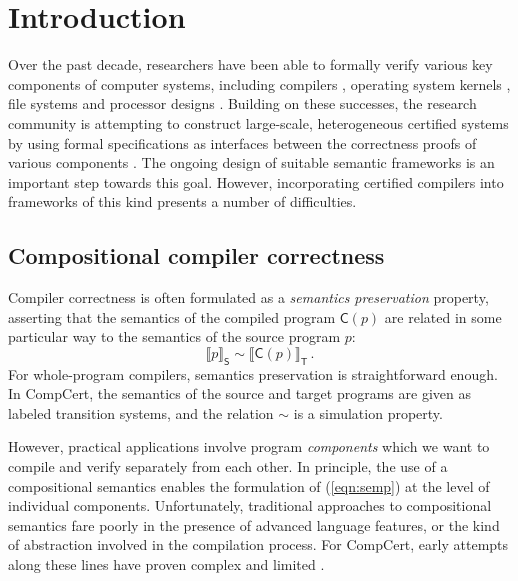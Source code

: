 \documentclass[sigplan,screen,review]{acmart}
\newcommand{\kw}[1]{\ensuremath{ \mathsf{#1} }}
\begin{document}


\maketitle

\section{Introduction} %


Over the past decade,
researchers have been able to formally verify
various key components of computer systems,
including
compilers \cite{compcert, vellvm},
operating system kernels \cite{sel4,popl15},
file systems \cite{fscq} and
processor designs \cite{safe,kami}.
Building on these successes,
the research community is attempting
to construct large-scale, heterogeneous certified systems
by using formal specifications as interfaces between
the correctness proofs of various components
\cite{deepspec}.
The ongoing design of suitable semantic frameworks
is an important step towards this goal.
However,
incorporating certified compilers
into frameworks of this kind
presents a number of difficulties.


\subsection{Compositional compiler correctness} %

Compiler correctness is often formulated as a
\emph{semantics preservation} property,
asserting that the semantics
of the compiled program $\kw{C}(p)$
are related in some particular way
to the semantics
of the source program $p$:
\begin{equation} \label{eqn:semp}
  \llbracket p \rrbracket_\kw{S} \sim
  \llbracket \kw{C}(p) \rrbracket_\kw{T}
  \,.
\end{equation}
For whole-program compilers,
semantics preservation is straightforward enough.
In CompCert,
the semantics of the source and target programs
are given as labeled transition systems,
and the relation $\sim$ is a simulation property.

However,
practical applications involve
program \emph{components} which we want to compile
and verify separately from each other.
In principle,
the use of a compositional semantics
enables the formulation of (\ref{eqn:semp})
at the level of individual components.
Unfortunately, traditional approaches to compositional semantics
fare poorly in the presence of advanced language features,
or the kind of abstraction
involved in the compilation process.
For CompCert,
early attempts along these lines
have proven
complex and limited \cite{cpp15,compcompcert}.
\end{document}
